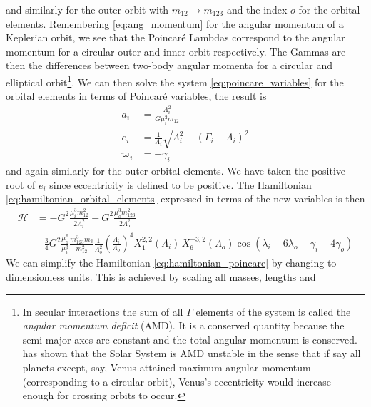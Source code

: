\documentclass[twoside,openright,titlepage,numbers=noenddot,headinclude,%
                footinclude=true,cleardoublepage=empty,abstractoff, 
                BCOR=5mm,paper=a4,fontsize=11pt,%
                american,%
                ]{scrreprt}%
\begin{document}
and similarly for the outer orbit with $m_{12}\rightarrow m_{123}$ and the
index $o$ for the orbital elements. Remembering \cref{eq:ang_momentum} for 
the angular momentum of a Keplerian orbit, we see that the Poincaré 
Lambdas correspond to the angular momentum for a circular outer and inner orbit
respectively. The Gammas are then the differences between two-body angular
momenta for a circular and elliptical orbit\footnote{In secular interactions
the sum of all $\Gamma$ elements of the system
is called the \emph{angular momentum deficit} (AMD). It is a conserved quantity
because the semi-major axes are constant and the total angular momentum is conserved.
\citet{laskar} has shown that the Solar System is AMD unstable in the sense that
if say all planets except, say, Venus attained maximum angular momentum (corresponding
to a circular orbit), Venus's eccentricity would increase enough for crossing
orbits to occur.}.
We can then solve the system 
\ref{eq:poincare_variables} for the orbital elements in terms of Poincaré
variables, the result is
\begin{equation}
    \begin{aligned}
        a_i&= \frac{\Lambda_i^2}{G\mu_i^2m_{12}} \\
        e_i &= \frac{1}{\Lambda_i} \sqrt{\Lambda_i^2-(\Gamma_i-\Lambda_i)^2}\\
        \varpi_i&=-\gamma_i
    \end{aligned}
    \label{eq:orbital_elems_in_terms_of_poincare}
\end{equation}
and again similarly for the outer orbital elements. We have taken the positive root
of $e_i$ since eccentricity is defined to be positive. The Hamiltonian
\ref{eq:hamiltonian_orbital_elements} expressed in terms of the new variables
is then
\begin{equation}
    \begin{aligned}
        \mathcal{H}&=-G^2 \frac{\mu_i^3m_{12}^2}{2\Lambda_i^2}  
        -G^2 \frac{\mu_o^3m_{123}^2}{2\Lambda_o^2}\\ 
        &-\frac{3}{4}G^2 \frac{\mu_o^6}{\mu_i^3} \frac{m_{123}^3m_3}{m_{12}^2}
        \frac{1}{\Lambda_o^2} \left(\frac{\Lambda_i}{\Lambda_o}\right)^4
    X^{2,2}_1(\Lambda_i)\,X^{-3,2}_6(\Lambda_o)\cos(\lambda_i-6\lambda_o
    -\gamma_i - 4\gamma_o)
    \end{aligned}
    \label{eq:hamiltonian_poincare}
\end{equation}
We can simplify the Hamiltonian \ref{eq:hamiltonian_poincare} by changing
to dimensionless units. This is achieved by scaling all masses, lengths and
\end{document}
